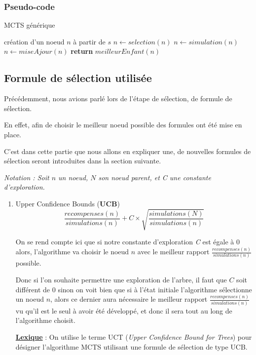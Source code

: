 \documentclass[pdftex,french, english]{article}	%
\begin{document}
	\subsubsection{Pseudo-code}
	\begin{algorithm}
	\caption{MCTS générique}
	  \label{alg:mcts}
	\begin{algorithmic}[1]
	\State création d'un noeud $n$ à partir de $s$
			\State $n \gets selection(n)$ 
			\State $n \gets simulation(n)$
			\State $n \gets miseAjour(n)$
		\EndWhile
	\State \textbf{return} $meilleurEnfant(n)$
	\EndFunction
	\end{algorithmic}
	\end{algorithm}
    
    
    
    
    
	\subsection{Formule de sélection utilisée} \label{selection}
	Précédemment, nous avions parlé lors de l'étape de sélection, de formule de sélection. 

	En effet, afin de choisir le meilleur noeud possible des formules ont été mise en place.

	C'est dans cette partie que nous allons en expliquer une, de nouvelles formules de sélection seront introduites
	dans la section suivante.


	\textit{Notation : Soit $n$ un noeud, $N$ son noeud parent, et C une constante d'exploration.} 

	\begin{enumerate}
		\item Upper Confidence Bounds (\textbf{UCB}) \\
		\[ \frac{recompenses(n)}{simulations(n)} + C \times \sqrt{\frac{simulations(N)}{simulations(n)}} \] 

		On se rend compte ici que si notre constante d'exploration \textit{C} est égale à $0$ alors, l'algorithme va choisir le noeud $n$ avec le meilleur rapport $\frac{recompenses(n)}{simulations(n)}$ possible. 

		Donc si l'on souhaite permettre une exploration de l'arbre, il faut que $C$ soit différent de $0$ sinon on voit bien que si à l'état initiale l'algorithme sélectionne un noeud $n$, alors ce dernier aura nécessaire le meilleur rapport $\frac{recompenses(n)}{simulations(n)}$ vu qu'il est le seul à avoir été développé, et donc il sera tout au long de l'algorithme choisit. 


		\underline{\textbf{Lexique}} : On utilise le terme UCT (\textit{Upper Confidence Bound for Trees}) pour désigner l'algorithme MCTS utilisant une formule de sélection de type UCB.
	\end{enumerate}
\end{document}
